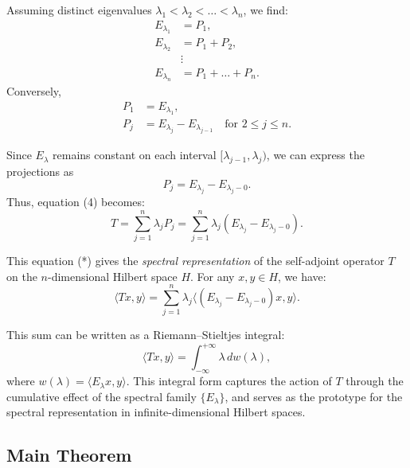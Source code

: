 Assuming distinct eigenvalues \( \lambda_1 < \lambda_2 < \dots < \lambda_n \), we find:
\begin{align*}
    E_{\lambda_1} &= P_1, \\
    E_{\lambda_2} &= P_1 + P_2, \\
                  &\vdots \\
    E_{\lambda_n} &= P_1 + \dots + P_n.
\end{align*}
Conversely,
\begin{align*}
    P_1 &= E_{\lambda_1}, \\
    P_j &= E_{\lambda_j} - E_{\lambda_{j-1}} \quad \text{for } 2 \leq j \leq n.
\end{align*}

Since \( E_\lambda \) remains constant on each interval \( [\lambda_{j-1}, \lambda_j) \), we can express the projections as
\[
    P_j = E_{\lambda_j} - E_{\lambda_j - 0}.
\]
Thus, equation (4) becomes:
\[
    T = \sum_{j=1}^n \lambda_j P_j = \sum_{j=1}^n \lambda_j (E_{\lambda_j} - E_{\lambda_j - 0}). \tag{*}
\]

This equation (*) gives the \textit{spectral representation} of the self-adjoint operator \( T \) on the \( n \)-dimensional Hilbert space \( H \). For any \( x, y \in H \), we have:
\[
    \langle Tx, y \rangle = \sum_{j=1}^n \lambda_j \langle (E_{\lambda_j} - E_{\lambda_j - 0})x, y \rangle.
\]

This sum can be written as a Riemann–Stieltjes integral:
\[
    \langle Tx, y \rangle = \int_{-\infty}^{+\infty} \lambda \, d w(\lambda),
\]
where \( w(\lambda) = \langle E_\lambda x, y \rangle \). This integral form captures the action of \( T \) through the cumulative effect of the spectral family \( \{E_\lambda\} \), and serves as the prototype for the spectral representation in infinite-dimensional Hilbert spaces.



\subsection{Main Theorem}


